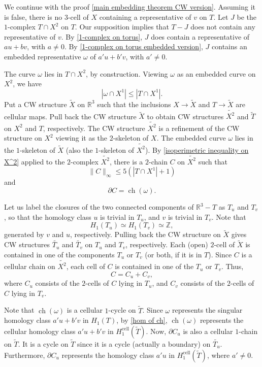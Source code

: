 \documentclass[12pt]{amsart}
\DeclareMathOperator*{\ch}{ch}
\DeclareMathOperator*{\cell}{cell}
\theoremstyle{definition}
\begin{document}
We continue with the proof \cref{main embedding theorem CW version}. Assuming it is false, there is no $3$-cell of $X$ containing a representative of $v$ on $T$. Let $J$ be the $1$-complex $T\cap X^2$ on $T$. Our supposition implies that $T-J$ does not contain any representative of $v$. By \cref{1-complex on torus}, $J$ does contain a representative of $au+bv$, with $a\neq 0$. By \cref{1-complex on torus embedded version}, $J$ contains an embedded representative $\omega$ of $a'u+b'v$, with $a'\neq 0$.

The curve $\omega$ lies in $T\cap X^2$, by construction. Viewing $\omega$ as an embedded curve on $X^2$, we have $$|\omega\cap X^1|\leq |T\cap X^1|.$$ Put a CW structure $\widetilde{X}$ on $\mathbb{R}^3$ such that the inclusions $X\to \widetilde{X}$ and $T\to \widetilde{X}$ are cellular maps. Pull back the CW structure $\widetilde{X}$ to obtain CW structures $\widetilde{X^2}$ and $\widetilde{T}$ on $X^2$ and $T$, respectively. The CW structure $\widetilde{X^2}$ is a refinement of the CW structure on $X^2$ viewing it as the $2$-skeleton of $X$. The embedded curve $\omega$ lies in the $1$-skeleton of $\widetilde{X}$ (also the $1$-skeleton of $\widetilde{X^2}$). By \cref{isoperimetric inequality on X^2} applied to the $2$-complex $\widetilde{X^2}$, there is a $2$-chain $C$ on $\widetilde{X^2}$ such that $$\|C\|_\infty\leq 5(|T\cap X^1|+1)$$ and $$\partial C=\ch(\omega).$$ 

Let us label the closures of the two connected components of $\mathbb{R}^3-T$ as $T_u$ and $T_v$, so that the homology class $u$ is trivial in $T_u$, and $v$ is trivial in $T_v$. Note that $$H_1(T_u)\simeq H_1(T_v)\simeq \mathbb{Z},$$ generated by $v$ and $u$, respectively. Pulling back the CW structure on $\widetilde{X}$ gives CW structures $\widetilde{T_u}$ and $\widetilde{T_v}$ on $T_u$ and $T_v$, respectively. Each (open) $2$-cell of $\widetilde{X}$ is contained in one of the components $T_u$ or $T_v$ (or both, if it is in $T$). Since $C$ is a cellular chain on $\widetilde{X^2}$, each cell of $C$ is contained in one of the $T_u$ or $T_v$. Thus, $$C=C_{u}+C_{v},$$ where $C_u$ consists of the $2$-cells of $C$ lying in $T_u$, and $C_v$ consists of the $2$-cells of $C$ lying in $T_v$. 

Note that $\ch(\omega)$ is a cellular $1$-cycle on $\widetilde{T}$. Since $\omega$ represents the singular homology class $a'u+b'v$ in $H_1(T)$, by \cref{hom of ch}, $\ch(\omega)$ represents the cellular homology class $a'u+b'v$ in $H_1^{\cell}(\widetilde{T})$. Now, $\partial C_u$ is also a cellular $1$-chain on $\widetilde{T}$. It is a cycle on $\widetilde{T}$ since it is a cycle (actually a boundary) on $\widetilde{T_u}$. Furthermore, $\partial C_u$ represents the homology class $a'u$ in $H_1^{\cell}(\widetilde{T})$, where $a'\neq 0$. 
\end{document}
